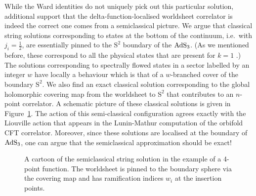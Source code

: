 \documentclass[12pt,a4paper]{article}
\begin{document}
While the Ward identities do not uniquely pick out this particular solution, additional support that the delta-function-localised worldsheet correlator is indeed the correct one comes from a semiclassical picture. We argue  that classical string solutions corresponding to states at the bottom of the continuum, i.e.\ with $j_i=\frac{1}{2}$, are essentially pinned to the $\text{S}^2$ boundary of the ${\rm AdS}_3$. (As we mentioned before, these correspond to all the physical states that are present for $k=1$ \cite{Eberhardt:2018ouy}.) The solutions corresponding to spectrally flowed states in a sector labelled by an integer $w$ have locally a behaviour which is that of a $w$-branched cover of the boundary $\text{S}^2$. We also find an exact classical solution corresponding to the global holomorphic covering map from the worldsheet to $\text{S}^2$ that contributes to an $n$-point correlator. A schematic picture of these classical solutions is given in Figure~\ref{fig:4pt function}. The action of this semi-classical configuration agrees exactly with the Liouville action that appears in the Lunin-Mathur computation of the orbifold CFT correlator. Moreover, since these solutions are localised at the boundary of ${\rm AdS}_3$, one can argue that the semiclassical approximation should be exact! 

\begin{figure}
\begin{center}
\end{center}
\caption{A cartoon of the semiclassical string solution in the example of a 4-point function. The worldsheet is pinned to the boundary sphere via the covering map and has ramification indices $w_i$ at the insertion points.}\label{fig:4pt function}
\end{figure}
\end{document}
